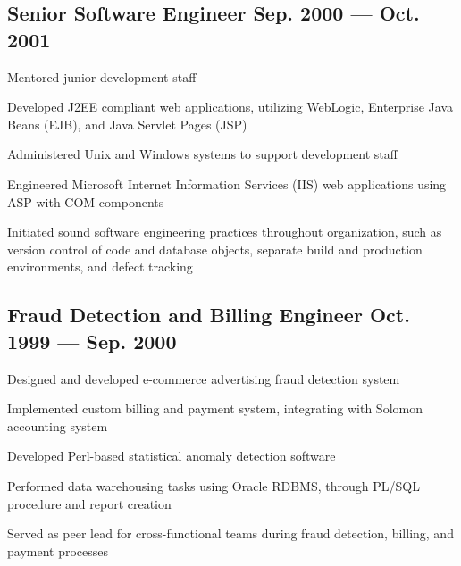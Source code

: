 \documentclass[letter,10pt]{article}
\begin{document}
\subsection{Senior Software Engineer \hfill Sep. 2000 --- Oct. 2001}
\begin{zitemize}
	\item Mentored junior development staff
	\item Developed J2EE compliant web applications, utilizing
	WebLogic, Enterprise Java Beans (EJB), and Java Servlet
	Pages (JSP)
	\item Administered Unix and Windows systems to support
	development staff
	\item Engineered Microsoft Internet Information Services (IIS)
	web applications using ASP with COM components
	\item Initiated sound software engineering practices throughout
	organization, such as version control of code and
	database objects, separate build and production
	environments, and defect tracking
\end{zitemize}

\subsection{Fraud Detection and Billing Engineer \hfill Oct. 1999 ---
	Sep. 2000}
\begin{zitemize}
	\item Designed and developed e-commerce advertising fraud
	detection system
	\item Implemented custom billing and payment system, integrating
	with Solomon accounting system
	\item Developed Perl-based statistical anomaly detection
	software
	\item Performed data warehousing tasks using Oracle RDBMS,
	through PL/SQL procedure and report creation
	\item Served as peer lead for cross-functional teams during
	fraud detection, billing, and payment processes
\end{zitemize}

\end{document}
